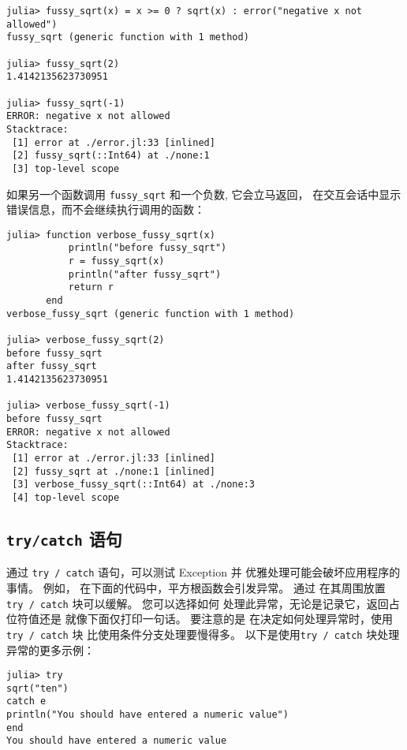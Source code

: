 \begin{verbatim}
julia> fussy_sqrt(x) = x >= 0 ? sqrt(x) : error("negative x not allowed")
fussy_sqrt (generic function with 1 method)

julia> fussy_sqrt(2)
1.4142135623730951

julia> fussy_sqrt(-1)
ERROR: negative x not allowed
Stacktrace:
 [1] error at ./error.jl:33 [inlined]
 [2] fussy_sqrt(::Int64) at ./none:1
 [3] top-level scope
\end{verbatim}



如果另一个函数调用 \texttt{fussy\_sqrt} 和一个负数, 它会立马返回， 在交互会话中显示错误信息，而不会继续执行调用的函数：




\begin{verbatim}
julia> function verbose_fussy_sqrt(x)
           println("before fussy_sqrt")
           r = fussy_sqrt(x)
           println("after fussy_sqrt")
           return r
       end
verbose_fussy_sqrt (generic function with 1 method)

julia> verbose_fussy_sqrt(2)
before fussy_sqrt
after fussy_sqrt
1.4142135623730951

julia> verbose_fussy_sqrt(-1)
before fussy_sqrt
ERROR: negative x not allowed
Stacktrace:
 [1] error at ./error.jl:33 [inlined]
 [2] fussy_sqrt at ./none:1 [inlined]
 [3] verbose_fussy_sqrt(::Int64) at ./none:3
 [4] top-level scope
\end{verbatim}



\hypertarget{11842305126309838851}{}


\subsection{\texttt{try/catch} 语句}



通过 \texttt{try / catch} 语句，可以测试 Exception 并 优雅处理可能会破坏应用程序的事情。 例如， 在下面的代码中，平方根函数会引发异常。 通过 在其周围放置 \texttt{try / catch} 块可以缓解。 您可以选择如何 处理此异常，无论是记录它，返回占位符值还是 就像下面仅打印一句话。 要注意的是 在决定如何处理异常时，使用\texttt{try / catch} 块 比使用条件分支处理要慢得多。 以下是使用\texttt{try / catch} 块处理异常的更多示例：




\begin{verbatim}
julia> try
sqrt("ten")
catch e
println("You should have entered a numeric value")
end
You should have entered a numeric value
\end{verbatim}



